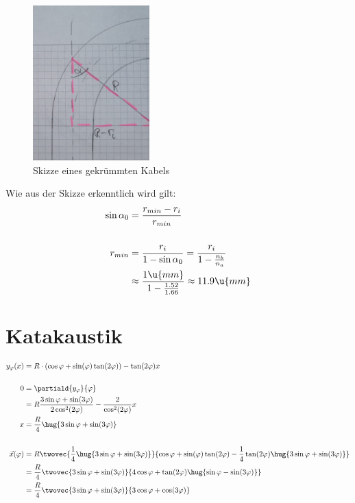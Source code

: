 \documentclass[ex]{exercise}
\begin{document}
\begin{figure}[H]
    \centering
    \includegraphics[width=0.4\textwidth]{2.jpg}
    \caption{Skizze eines gekrümmten Kabels}
\end{figure}

Wie aus der Skizze erkenntlich wird gilt:
\begin{align*}
    \sin\alpha_0 &= \frac{r_{min}-r_i}{r_{min}}\\
    \\
    r_{min} &= \frac{r_i}{1-\sin\alpha_0} = \frac{r_i}{1-\frac{n_b}{n_a}}\\
    &\approx \frac{1\u{mm}}{1- \frac{1.52}{1.66}}
    \approx 11.9 \u{mm} 
\end{align*}

\section{Katakaustik}
\begin{align*}
    y_\varphi(x) %
    &= R\cdot (\cos\varphi + \sin(\varphi)\tan(2\varphi)) - \tan(2\varphi)x\\
    \\
    0 &= \partiald{y_\varphi}{\varphi} \\
    &= R\frac{3\sin\varphi + \sin(3\varphi)}{2\cos^2(2\varphi)} - \frac{2}{\cos^2(2\varphi)}x\\
    x &= \frac R4\hug{3\sin\varphi + \sin(3\varphi)}\\
    \\
    \vec x(\varphi) &= R \twovec{\frac 14\hug{3\sin\varphi + \sin(3\varphi)}}
    {\cos\varphi + \sin(\varphi)\tan(2\varphi) - \frac 14\tan(2\varphi)\hug{3\sin\varphi + \sin(3\varphi)}}\\
    &= \frac R4 \twovec{3\sin\varphi + \sin(3\varphi)}
    {4\cos\varphi + \tan(2\varphi)\hug{\sin\varphi - \sin(3\varphi)}}\\
    &= \frac R4 \twovec{3\sin\varphi + \sin(3\varphi)}
    {3\cos\varphi + \cos(3\varphi)}
\end{align*}


\end{document}
